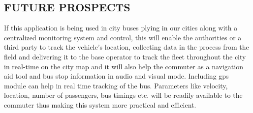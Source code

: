 \documentclass[12pt,a4paper,oneside]{report}
\begin{document}
\begin{onehalfspacing}
\newpage
\section{FUTURE PROSPECTS}
\par
\hspace{.7cm}
   If this application is being used in city buses plying in our cities along with a centralized monitoring system and control, this will enable the authorities or a third party to track the vehicle's location, collecting data in the process from the field and delivering it to the base operator to track the fleet throughout the city in real-time on the city map and it will also help the commuter as a navigation aid tool and bus stop information in audio and visual mode. 
  Including gps module can help in real time tracking of the bus. Parameters like velocity, location, number of passengers, bus timings etc. will be readily available to the commuter  thus making this system more  practical and efficient.






\end{onehalfspacing}
\end{document}
